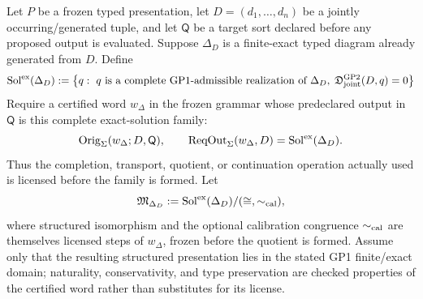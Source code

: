 \documentclass[12pt,a4paper]{article}
\begin{document}
\begin{theorem}
\label{p2a:thm:generated-exact-solution-moduli}
Let \(P\) be a frozen typed presentation, let
\(D=(d_1,\ldots,d_n)\) be a jointly occurring/generated tuple, and let
\(\mathsf Q\) be a target sort declared before any proposed output is
evaluated.  Suppose \(\Delta_D\) is a finite-exact typed diagram already
generated from \(D\).  Define
\[
 \operatorname{Sol}^{\rm ex}(\Delta_D)
 :=\left\{
 q:\ q\text{ is a complete GP1-admissible realization of }\Delta_D,
 \; \mathfrak D^{\rm GP2}_{\rm joint}(D,q)=0
 \right\}
\]
Require a certified word \(w_{\Delta}\) in the frozen grammar whose predeclared
output in \(\mathsf Q\) is this complete exact-solution family:
\[
 \operatorname{Orig}_{\Sigma}(w_{\Delta};D,\mathsf Q),
 \qquad
 \operatorname{ReqOut}_{\Sigma}(w_{\Delta},D)
 =\operatorname{Sol}^{\rm ex}(\Delta_D).
\]
Thus the completion, transport, quotient, or continuation operation actually
used is licensed before the family is formed.  Let
\[
 \mathfrak M_{\Delta_D}
 :=\operatorname{Sol}^{\rm ex}(\Delta_D)/(\cong,\sim_{\rm cal}),
\]
where structured isomorphism and the optional calibration congruence
\(\sim_{\rm cal}\) are themselves licensed steps of \(w_{\Delta}\), frozen
before the quotient is formed.  Assume only that the resulting structured
presentation lies in the stated GP1 finite/exact domain; naturality,
conservativity, and type preservation are checked properties of the certified
word rather than substitutes for its license.


\end{theorem}
\end{document}
